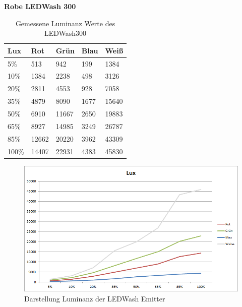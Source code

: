 \documentclass[11pt]{scrartcl}
\begin{document}
\textbf{Robe LEDWash 300}
\begin{table}[H]
    \begin{tabularx}{\textwidth}{|X|X|X|X|X|}
        \hline
        Lux   & Rot   & Grün  & Blau & Weiß \\\hline
        5\%   & 513   & 942   & 199  & 1384 \\\hline
        10\%  & 1384  & 2238  & 498  & 3126 \\\hline
        20\%  & 2811  & 4553  & 928  & 7058 \\\hline
        35\%  & 4879  & 8090  & 1677 & 15640\\\hline
        50\%  & 6910  & 11667 & 2650 & 19883\\\hline
        65\%  & 8927  & 14985 & 3249 & 26787\\\hline
        85\%  & 12662 & 20220 & 3962 & 43309\\\hline
        100\% & 14407 & 22931 & 4383 & 45830\\\hline
    \end{tabularx}
    \caption{Gemessene Luminanz Werte des LEDWash300} \label{table:luxLedWash}
\end{table}
\noindent
\begin{figure}[H]
    \begin{center}
        \includegraphics[width=\textwidth]{images/charts/led_wash_300.png}
    \end{center}
    \caption{Darstellung Luminanz der LEDWash Emitter} \label{fig:luxLedWash}
\end{figure}
\end{document}
